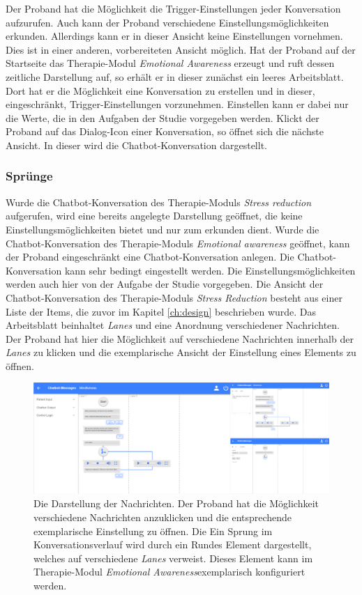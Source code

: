 Der Proband hat die Möglichkeit die Trigger-Einstellungen jeder Konversation aufzurufen. Auch kann der Proband verschiedene Einstellungsmöglichkeiten erkunden. Allerdings kann er in dieser Ansicht keine Einstellungen vornehmen. Dies ist in einer anderen, vorbereiteten Ansicht möglich. Hat der Proband auf der Startseite das Therapie-Modul \emph{Emotional Awareness} erzeugt und ruft dessen zeitliche Darstellung auf, so erhält er in dieser zunächst ein leeres Arbeitsblatt. Dort hat er die Möglichkeit eine Konversation zu erstellen und in dieser, eingeschränkt, Trigger-Einstellungen vorzunehmen. Einstellen kann er dabei nur die Werte, die in den Aufgaben der Studie vorgegeben werden. Klickt der Proband auf das Dialog-Icon einer Konversation, so öffnet sich die nächste Ansicht. In dieser wird die Chatbot-Konversation dargestellt. 

\subsubsection{Sprünge}
Wurde die Chatbot-Konversation des Therapie-Moduls \emph{Stress reduction} aufgerufen, wird eine bereits angelegte Darstellung geöffnet, die keine Einstellungsmöglichkeiten bietet und nur zum erkunden dient. Wurde die Chatbot-Konversation des Therapie-Moduls \emph{Emotional awareness} geöffnet, kann der Proband eingeschränkt eine Chatbot-Konversation anlegen. Die Chatbot-Konversation kann sehr bedingt eingestellt werden. Die Einstellungsmöglichkeiten werden auch hier von der Aufgabe der Studie vorgegeben. Die Ansicht der Chatbot-Konversation des Therapie-Moduls \emph{Stress Reduction} besteht aus einer Liste der Items, die zuvor im Kapitel \ref{ch:design} beschrieben wurde. Das Arbeitsblatt beinhaltet \emph{Lanes} und eine Anordnung verschiedener Nachrichten. Der Proband hat hier die Möglichkeit auf verschiedene Nachrichten innerhalb der \emph{Lanes} zu klicken und die exemplarische Ansicht der Einstellung eines Elements zu öffnen.

\begin{figure}[h]
\centering
\includegraphics[width=1\textwidth]{pictures/textset}
\caption{Die Darstellung der Nachrichten. Der Proband hat die Möglichkeit verschiedene Nachrichten anzuklicken und die entsprechende exemplarische Einstellung zu öffnen. Die Ein Sprung im Konversationsverlauf wird durch ein Rundes Element dargestellt, welches auf verschiedene \emph{Lanes} verweist. Dieses Element kann im Therapie-Modul \emph{Emotional Awareness}exemplarisch konfiguriert werden.} 
\label{textset}
\end{figure}

